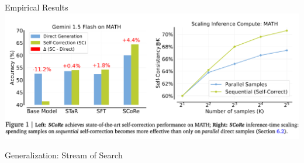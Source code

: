 \documentclass[14pt,aspectratio=169]{beamer}
\begin{document}
\begin{frame}{Empirical Results}
	\includegraphics[width=\textwidth]{images/score_figure_1.png}
\end{frame}


\begin{frame}{Generalization: Stream of Search}
	\begin{columns}
		\begin{column}{0.5\linewidth}


\end{column}
\end{columns}
\end{frame}
\end{document}
